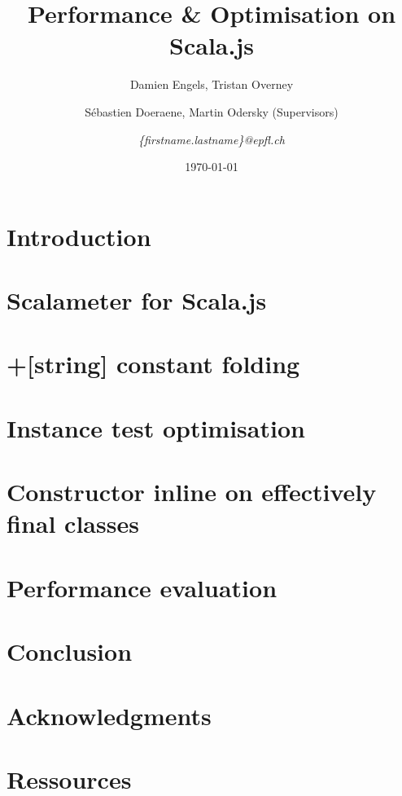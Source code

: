 \documentclass{article}
\begin{document}
\title{Performance \& Optimisation on Scala.js}
\author{Damien Engels, Tristan Overney\and S\'{e}bastien Doeraene, Martin
Odersky (Supervisors)\and \emph{\{firstname.lastname\}@epfl.ch}}
\date{\today}
\maketitle

\nocite{*}

\section{Introduction}


\section{Scalameter for Scala.js} \label{scalameter}


\section{+[string] constant folding}


\section{Instance test optimisation}


\section{Constructor inline on effectively final classes}


\section{Performance evaluation}


\section{Conclusion}


\section*{Acknowledgments}


\section*{Ressources}


{}

\end{document}

